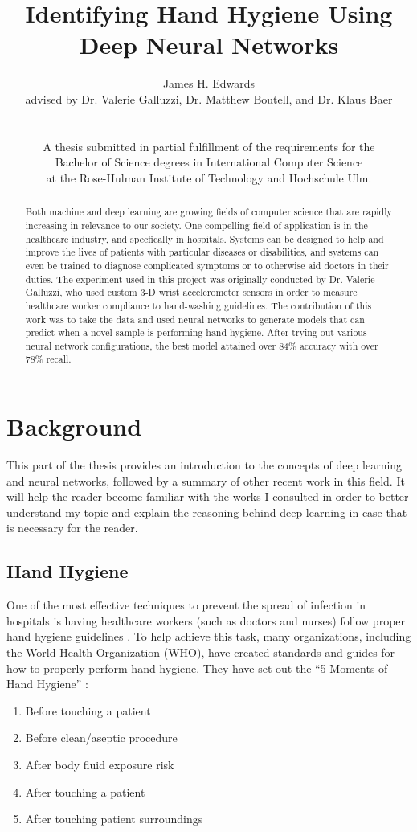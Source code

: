 \documentclass[]{report}
\title{Identifying Hand Hygiene Using Deep Neural Networks}
\author{James H. Edwards \\ 
	advised by Dr. Valerie Galluzzi, Dr. Matthew Boutell, and Dr. Klaus Baer\\
	\\
	\\
	A thesis submitted in partial fulfillment of the requirements for the \\
	Bachelor of Science degrees in International Computer Science \\
	at the Rose-Hulman Institute of Technology and Hochschule Ulm.}
\begin{document}
\maketitle
\tableofcontents

\begin{abstract}
	Both machine and deep learning are growing fields of computer science that are rapidly increasing in relevance to our society. One compelling field of application is in the healthcare industry, and specfically in hospitals. Systems can be designed to help and improve the lives of patients with particular diseases or disabilities, and systems can even be trained to diagnose complicated symptoms or to otherwise aid doctors in their duties. The experiment used in this project was originally conducted by Dr. Valerie Galluzzi, who used custom 3-D wrist accelerometer sensors in order to measure healthcare worker compliance to hand-washing guidelines. The contribution of this work was to take the data and used neural networks to generate models that can predict when a novel sample is performing hand hygiene. After trying out various neural network configurations, the best model attained over 84\% accuracy with over 78\% recall.
\end{abstract}

\chapter{Background}

This part of the thesis provides an introduction to the concepts of deep learning and neural networks, followed by a summary of other recent work in this field. It will help the reader become familiar with the works I consulted in order to better understand my topic and explain the reasoning behind deep learning in case that is necessary for the reader.


\section{Hand Hygiene}

One of the most effective techniques to prevent the spread of infection in hospitals is having healthcare workers (such as doctors and nurses) follow proper hand hygiene guidelines \cite{Galluzzi}. To help achieve this task, many organizations, including the World Health Organization (WHO), have created standards and guides for how to properly perform hand hygiene. They have set out the ``5 Moments of Hand Hygiene'' \cite{WHO}:
\begin{enumerate}
	\item Before touching a patient
	\item Before clean/aseptic procedure
	\item After body fluid exposure risk
	\item After touching a patient
	\item After touching patient surroundings
\end{enumerate}
\end{document}
